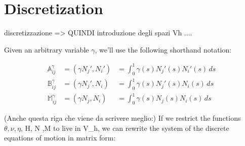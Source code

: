

\section{Discretization}\label{matrix-form-of-the-weak-formulation}

discretizzazione => QUINDI introduzione degli spazi Vh ....

Given an arbitrary variable $\gamma$, we’ll use the following shorthand notation:

\begin{equation}
  \label{eq:2}
  \begin{aligned}
   \mathbb{A}^\gamma_{ij} & = (\gamma N_j', N_i') &  = \int_0^1 \gamma(s) N_j'(s)
    N_i'(s) \, ds \\
     \mathbb{B}^\gamma_{ij} & = (\gamma N_j', N_i) & = \int_0^1 \gamma(s) N_j'(s)
    N_i(s) \, ds \\
     \mathbb{M}^\gamma_{ij} & = (\gamma N_j, N_i) & = \int_0^1 \gamma(s) N_j(s)
    N_i(s) \, ds 
  \end{aligned}
\end{equation}

(Anche questa riga che viene da scrivere meglio:)
If we restrict the functions $\theta, \nu, \eta$, H, N ,M to live in V_h, we
can rewrite the system of the discrete equations of motion in matrix form:

